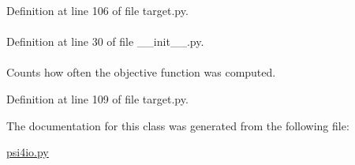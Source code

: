 \-Definition at line 106 of file target.\-py.

\hypertarget{classforcebalance_1_1BaseClass_afd68efa29ccd2f320f4cf82198214aac}{
\paragraph[{verbose\-\_\-options}]{}}\label{classforcebalance_1_1BaseClass_afd68efa29ccd2f320f4cf82198214aac}


\-Definition at line 30 of file \-\_\-\-\_\-init\-\_\-\-\_\-.\-py.

\hypertarget{classforcebalance_1_1target_1_1Target_ad4cd0ab38d8fc97d3e7a6e22ce130a16}{
\paragraph[{xct}]{}}\label{classforcebalance_1_1target_1_1Target_ad4cd0ab38d8fc97d3e7a6e22ce130a16}


\-Counts how often the objective function was computed. 



\-Definition at line 109 of file target.\-py.



\-The documentation for this class was generated from the following file\-:\begin{DoxyCompactItemize}
\item 
\hyperlink{psi4io_8py}{psi4io.\-py}\end{DoxyCompactItemize}
